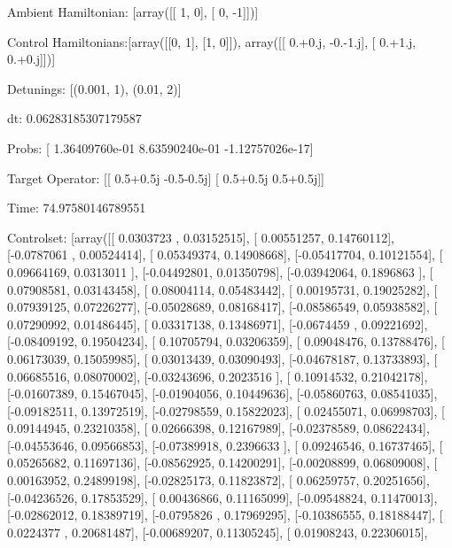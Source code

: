 \documentclass{article}
\begin{document}
    

\newpage

Ambient Hamiltonian: [array([[ 1,  0],
       [ 0, -1]])]

Control Hamiltonians:[array([[0, 1],
       [1, 0]]), array([[ 0.+0.j, -0.-1.j],
       [ 0.+1.j,  0.+0.j]])]

Detunings: [(0.001, 1), (0.01, 2)]

 dt: 0.06283185307179587

Probs: [  1.36409760e-01   8.63590240e-01  -1.12757026e-17]

Target Operator: [[ 0.5+0.5j -0.5-0.5j]
 [ 0.5+0.5j  0.5+0.5j]]

Time: 74.97580146789551

Controlset: [array([[ 0.0303723 ,  0.03152515],
       [ 0.00551257,  0.14760112],
       [-0.0787061 ,  0.00524414],
       [ 0.05349374,  0.14908668],
       [-0.05417704,  0.10121554],
       [ 0.09664169,  0.0313011 ],
       [-0.04492801,  0.01350798],
       [-0.03942064,  0.1896863 ],
       [ 0.07908581,  0.03143458],
       [ 0.08004114,  0.05483442],
       [ 0.00195731,  0.19025282],
       [ 0.07939125,  0.07226277],
       [-0.05028689,  0.08168417],
       [-0.08586549,  0.05938582],
       [ 0.07290992,  0.01486445],
       [ 0.03317138,  0.13486971],
       [-0.0674459 ,  0.09221692],
       [-0.08409192,  0.19504234],
       [ 0.10705794,  0.03206359],
       [ 0.09048476,  0.13788476],
       [ 0.06173039,  0.15059985],
       [ 0.03013439,  0.03090493],
       [-0.04678187,  0.13733893],
       [ 0.06685516,  0.08070002],
       [-0.03243696,  0.2023516 ],
       [ 0.10914532,  0.21042178],
       [-0.01607389,  0.15467045],
       [-0.01904056,  0.10449636],
       [-0.05860763,  0.08541035],
       [-0.09182511,  0.13972519],
       [-0.02798559,  0.15822023],
       [ 0.02455071,  0.06998703],
       [ 0.09144945,  0.23210358],
       [ 0.02666398,  0.12167989],
       [-0.02378589,  0.08622434],
       [-0.04553646,  0.09566853],
       [-0.07389918,  0.2396633 ],
       [ 0.09246546,  0.16737465],
       [ 0.05265682,  0.11697136],
       [-0.08562925,  0.14200291],
       [-0.00208899,  0.06809008],
       [ 0.00163952,  0.24899198],
       [-0.02825173,  0.11823872],
       [ 0.06259757,  0.20251656],
       [-0.04236526,  0.17853529],
       [ 0.00436866,  0.11165099],
       [-0.09548824,  0.11470013],
       [-0.02862012,  0.18389719],
       [-0.0795826 ,  0.17969295],
       [-0.10386555,  0.18188447],
       [ 0.0224377 ,  0.20681487],
       [-0.00689207,  0.11305245],
       [ 0.01908243,  0.22306015],
\end{document}
